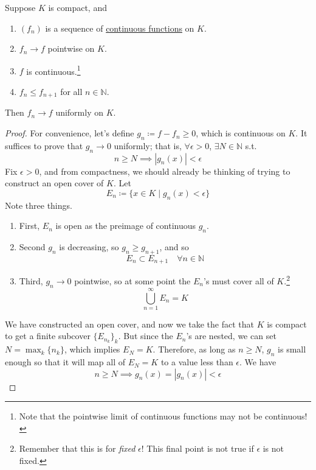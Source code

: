  \begin{theorem}
    \label{thm:dini}
    Suppose $K$ is compact, and 
    \begin{enumerate}
      \item $(f_n)$ is a sequence of \hyperref[pst-def:continuous_func]{continuous functions} on $K$. 
      \item $f_n \to f$ pointwise on $K$. 
      \item $f$ is continuous.\footnote{Note that the pointwise limit of continuous functions may not be continuous!}
      \item $f_n \leq f_{n+1}$ for all $n \in \mathbb{N}$. 
    \end{enumerate}
    Then $f_n \to f$ uniformly on $K$. 
  \end{theorem} 
  \begin{proof}
    For convenience, let's define $g_n \coloneqq f - f_n \geq 0$, which is continuous on $K$. It suffices to prove that $g_n \to 0$ uniformly; that is, $\forall \epsilon > 0$, $\exists N \in \mathbb{N}$ s.t. 
    \begin{equation}
      n \geq N \implies |g_n (x)| < \epsilon
    \end{equation}
    Fix $\epsilon > 0$, and from compactness, we should already be thinking of trying to construct an open cover of $K$. Let 
    \begin{equation}
      E_n \coloneqq \{ x \in K \mid g_n (x) < \epsilon \}
    \end{equation}
    Note three things. 
    \begin{enumerate}
      \item First, $E_n$ is open as the preimage of continuous $g_n$. 
      \item Second $g_n$ is decreasing, so $g_n \geq g_{n+1}$, and so 
      \begin{equation}
        E_n \subset E_{n+1} \quad \forall n \in \mathbb{N}
      \end{equation}
      \item Third, $g_n \to 0$ pointwise, so at some point the $E_n$'s must cover all of $K$.\footnote{Remember that this is for \textit{fixed} $\epsilon$! This final point is not true if $\epsilon$ is not fixed.} 
      \begin{equation}
        \bigcup_{n = 1}^{\infty} E_n = K
      \end{equation}
    \end{enumerate}
    We have constructed an open cover, and now we take the fact that $K$ is compact to get a finite subcover $\{E_{n_k}\}_{k}$. But since the $E_n$'s are nested, we can set $N = \max_k \{n_k\}$, which implies $E_N = K$. Therefore, as long as $n \geq N$, $g_n$ is small enough so that it will map all of $E_N = K$ to a value less than $\epsilon$. We have 
    \begin{equation}
      n \geq N \implies g_n (x) = |g_n (x)| < \epsilon
    \end{equation}
  \end{proof}

